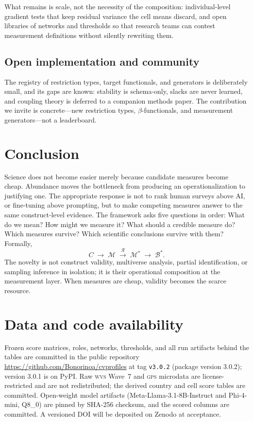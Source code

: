 \documentclass[10pt,letterpaper]{article}
\newcommand{\GPS}{\textsc{gps}}
\newcommand{\WVS}{\textsc{wvs}}
\newcommand{\M}{\ensuremath{\mathcal{M}}}
\newcommand{\Rset}{\mathcal{R}}
\newcommand{\Bset}{\mathcal{B}}
\begin{document}
What remains is scale, not the necessity of the composition: individual-level gradient tests that keep residual variance the cell means discard, and open libraries of networks and thresholds so that research teams can contest measurement definitions without silently rewriting them.

\subsection{Open implementation and community}
\label{sec:community}
The registry of restriction types, target functionals, and generators is deliberately small, and its gaps are known: stability is schema-only, slacks are never learned, and coupling theory is deferred to a companion methods paper.
The contribution we invite is concrete---new restriction types, $\beta$-functionals, and measurement generators---not a leaderboard.

\section{Conclusion}
\label{sec:conclusion}

Science does not become easier merely because candidate measures become cheap.
Abundance moves the bottleneck from producing an operationalization to justifying one.
The appropriate response is not to rank human surveys above AI, or fine-tuning above prompting, but to make competing measures answer to the same construct-level evidence.
The framework asks five questions in order: What do we mean?
How might we measure it?
What should a credible measure do?
Which measures survive?
Which scientific conclusions survive with them?
Formally,
\[
C\;\longrightarrow\;\M\;\xrightarrow{\;\Rset\;}\;\M^*\;\longrightarrow\;\Bset^*.
\]
The novelty is not construct validity, multiverse analysis, partial identification, or sampling inference in isolation; it is their operational composition at the measurement layer.
When measures are cheap, validity becomes the scarce resource.

\section*{Data and code availability}
Frozen score matrices, roles, networks, thresholds, and all run artifacts behind the tables are committed in the public repository \url{https://github.com/Bonorinoa/cvprofiles} at tag \texttt{v3.0.2} (package version 3.0.2); version 3.0.1 is on PyPI.
Raw \WVS{} Wave~7 and \GPS{} microdata are license-restricted and are not redistributed; the derived country and cell score tables are committed.
Open-weight model artifacts (Meta-Llama-3.1-8B-Instruct and Phi-4-mini, Q8\_0) are pinned by SHA-256 checksum, and the scored columns are committed.
A versioned DOI will be deposited on Zenodo at acceptance.
\end{document}
